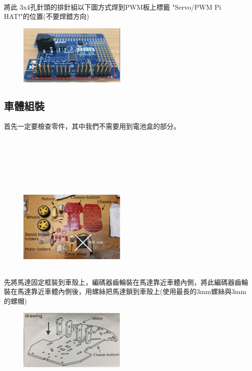 \documentclass{article}
\begin{document}
\\
將此 3x4孔針頭的排針組以下圖方式焊到PWM板上標籤 "Servo/PWM Pi HAT!"的位置(不要焊錯方向)
\\
\begin{figure}[htp]
    \begin{center}
        \includegraphics[width=150pt]{pic/1_1_11.png}
    \end{center}
\end{figure}

\subsection{車體組裝}
首先一定要檢查零件，其中我們不需要用到電池盒的部分。
\\\\\\\\\\\\\\
\begin{figure}[htp]
    \begin{center}
        \includegraphics[width=150pt]{pic/1_1_12.png}
    \end{center}
\end{figure}
\\
先將馬達固定框裝到車殼上，編碼器齒輪裝在馬達靠近車體內側，將此編碼器齒輪裝在馬達靠近車體內側後，用螺絲把馬達鎖到車殼上(使用最長的3mm螺絲與3mm的螺帽)
\\
\begin{figure}[htp]
    \begin{center}
        \includegraphics[width=150pt]{pic/1_1_13.png}
    \end{center}
\end{figure}
\end{document}
